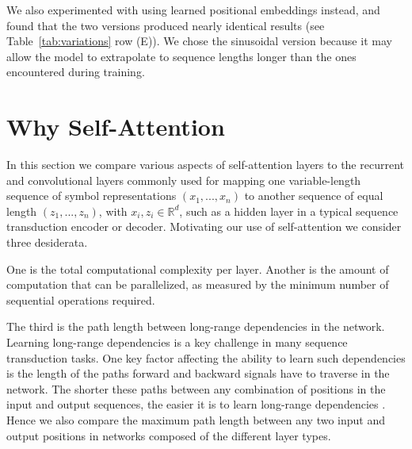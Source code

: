 \documentclass{article}
\begin{document}
We also experimented with using learned positional embeddings \citep{JonasFaceNet2017} instead, and found that the two versions produced nearly identical results (see Table~\ref{tab:variations} row (E)).  We chose the sinusoidal version because it may allow the model to extrapolate to sequence lengths longer than the ones encountered during training.

 
\section{Why Self-Attention}

In this section we compare various aspects of self-attention layers to the recurrent and convolutional layers commonly used for mapping one variable-length sequence of symbol representations $(x_1, ..., x_n)$ to another sequence of equal length $(z_1, ..., z_n)$, with $x_i, z_i \in \mathbb{R}^d$, such as a hidden layer in a typical sequence transduction encoder or decoder. Motivating our use of self-attention we consider three desiderata.

One is the total computational complexity per layer.
Another is the amount of computation that can be parallelized, as measured by the minimum number of sequential operations required.

The third is the path length between long-range dependencies in the network. Learning long-range dependencies is a key challenge in many sequence transduction tasks. One key factor affecting the ability to learn such dependencies is the length of the paths forward and backward signals have to traverse in the network. The shorter these paths between any combination of positions in the input and output sequences, the easier it is to learn long-range dependencies \citep{hochreiter2001gradient}. Hence we also compare the maximum path length between any two input and output positions in networks composed of the different layer types.
\end{document}
